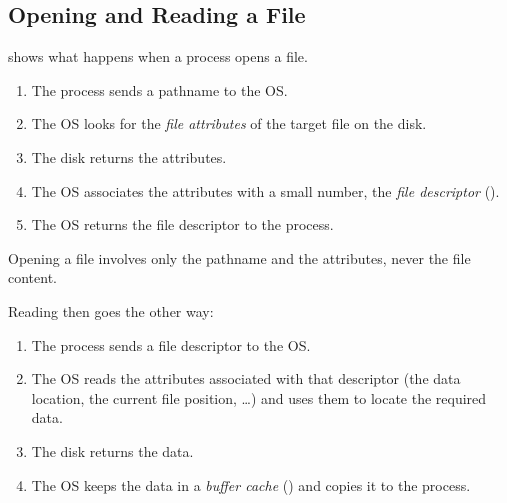\subsection{Opening and Reading a File}

 shows what happens when a process opens a file.
\begin{enumerate}
  \item The process sends a pathname to the OS.
  \item The OS looks for the \emph{file attributes} of the target file on the disk.
  \item The disk returns the attributes.
  \item The OS associates the attributes with a small number, the \emph{file descriptor} ().
  \item The OS returns the file descriptor to the process.
\end{enumerate}
Opening a file involves only the pathname and the attributes, never the file content.

Reading then goes the other way:
\begin{enumerate}
  \item The process sends a file descriptor to the OS.
  \item The OS reads the attributes associated with that descriptor (the data location, the current file position, \dots) and uses them to locate the required data.
  \item The disk returns the data.
  \item The OS keeps the data in a \emph{buffer cache} () and copies it to the process.
\end{enumerate}

